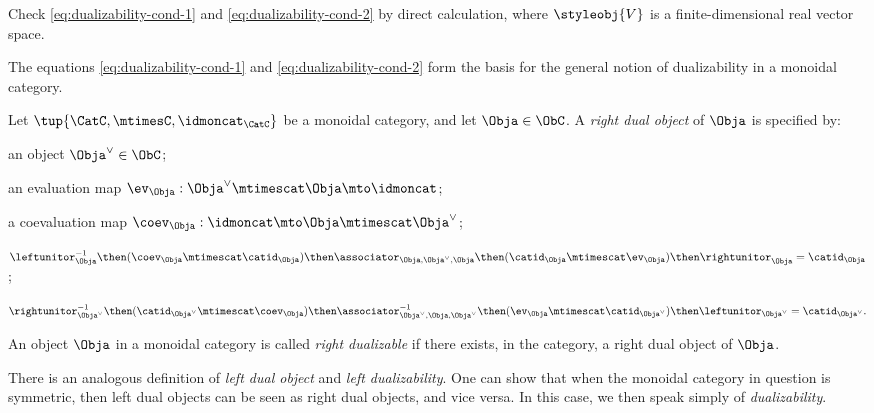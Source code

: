 \begin{gradedexercise}\label{ex:VectSnakeEquations}
Check \cref{eq:dualizability-cond-1} and \cref{eq:dualizability-cond-2} by direct calculation, where $\styleobj{V}$ is a finite-dimensional real vector space. 
\end{gradedexercise}




The equations \cref{eq:dualizability-cond-1} and \cref{eq:dualizability-cond-2} form the basis for the general notion of dualizability in a monoidal category. 

\begin{ctdefinition}\label{def:dualizable-object}
Let $\tup{\CatC,\mtimesC,\idmoncat_{\CatC}}$ be a monoidal category, and let $\Obja \in \ObC$. A \emph{right dual object} of $\Obja$ is specified by:

\constit
\begin{compactenum}
\item an object $\Obja^\vee \in \ObC$;
\item an evaluation map $\ev_\Obja: \Obja^\vee \mtimescat \Obja \mto \idmoncat$; 
\item a coevaluation map $\coev_\Obja: \idmoncat \mto \Obja \mtimescat \Obja^\vee$;
\end{compactenum}

\condit
\begin{compactenum}
\item $\leftunitor_{\Obja}^{-1} \then (\coev_\Obja \mtimescat \catid_\Obja) \then  \associator_{\Obja, \Obja^\vee, \Obja} \then(\catid_\Obja \mtimescat \ev_\Obja) \then \rightunitor_{\Obja} = \catid_\Obja$; 
\item $\rightunitor_{\Obja^\vee}^{-1} \then (\catid_{\Obja^\vee} \mtimescat \coev_\Obja)  \then \associator_{\Obja^\vee, \Obja, \Obja^\vee}^{-1} \then (\ev_\Obja \mtimescat \catid_{\Obja^\vee}) \then \leftunitor_{\Obja^\vee}  = \catid_{\Obja^\vee}.$

\end{compactenum}
\end{ctdefinition}

\begin{definition}
An object $\Obja$ in a monoidal category is called \emph{right dualizable} if there exists, in the category, a right dual object of $\Obja$. 
\end{definition}

\begin{remark}
There is an analogous definition of \emph{left dual object} and \emph{left dualizability}. One can show that when the monoidal category in question is symmetric, then left dual objects can be seen as right dual objects, and vice versa. In this case, we then speak simply of \emph{dualizability}. 
\end{remark}


